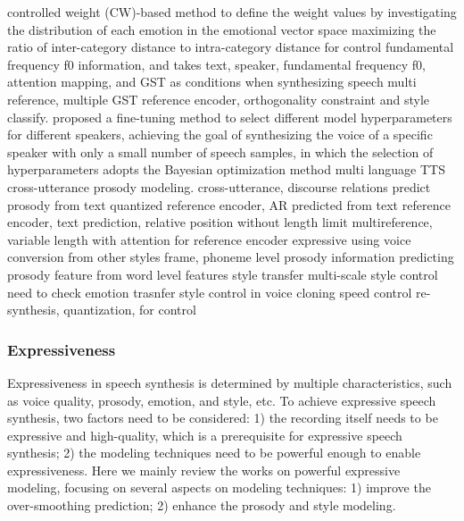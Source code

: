\documentclass{article}
\begin{document}
\cite{kwon2019effective} controlled weight (CW)-based method to define the weight values by investigating the distribution of each emotion in the emotional vector space
\cite{um2020emotional} maximizing the ratio of inter-category distance to intra-category distance  for control 
\cite{valle2020mellotron} fundamental frequency f0 information, and takes text, speaker, fundamental frequency f0, attention mapping, and GST as conditions when synthesizing speech
\cite{bian2019multi} multi reference, multiple GST reference encoder, orthogonality constraint and style classify. 
\cite{moss2020boffin} proposed a fine-tuning method to select different model hyperparameters for different speakers, achieving the goal of synthesizing the voice of a specific speaker with only a small number of speech samples, in which the selection of hyperparameters adopts the Bayesian optimization method
\citet{nekvinda2020one}  multi language TTS
\cite{xu2020improving}  cross-utterance prosody modeling.
\cite{aubin2019improving} cross-utterance, discourse relations
\cite{stanton2018predicting}  predict prosody from text
\cite{sun2020generating} quantized reference encoder,  AR predicted from text
\cite{zeng2020prosody} reference encoder, text prediction,  relative position without length limit 
\cite{choi2020attentron} multireference, variable length with attention for reference encoder
\cite{huybrechts2020low} expressive using voice conversion from other styles
\cite{lee2019robust} frame, phoneme level prosody information 
\cite{talman2019predicting} predicting prosody feature from word level features
\cite{karlapati2020copycat} style transfer
\cite{li2021towards} multi-scale style control 
\cite{lee2021styler}  need to check 
\cite{inoue2021model}  emotion trasnfer
\cite{neekhara2021expressive} style control in voice cloning
\cite{bae2020speaking} speed control
\cite{polyak2021speech} re-synthesis, quantization, for control
\fi


\iffalse
\subsubsection{Expressiveness}
Expressiveness in speech synthesis is determined by multiple characteristics, such as voice quality, prosody, emotion, and style, etc. To achieve expressive speech synthesis, two factors need to be considered: 1) the recording itself needs to be expressive and high-quality, which is a prerequisite for expressive speech synthesis; 2) the modeling techniques need to be powerful enough to enable expressiveness. Here we mainly review the works on powerful expressive modeling, focusing on several aspects on modeling techniques: 1) improve the over-smoothing prediction; 2) enhance the prosody and style modeling. 
\end{document}
